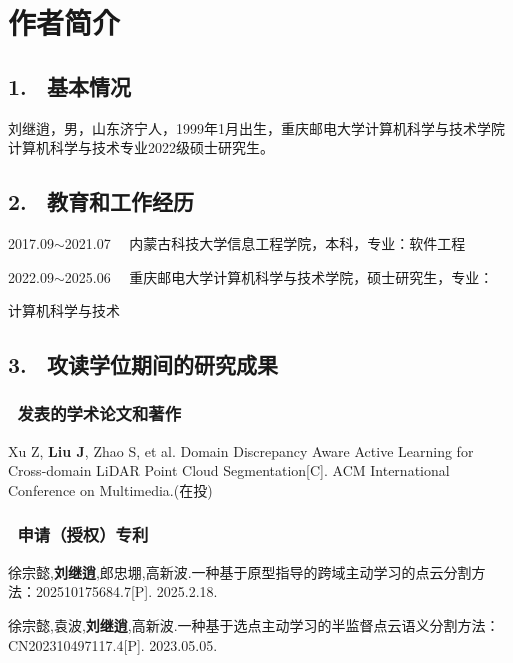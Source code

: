 \specialsectioning


\chapter{作者简介}
\thispagestyle{others}
\pagestyle{others}
\xiaosi
\section{1. \ 基本情况}
刘继逍，男，山东济宁人，1999年1月出生，重庆邮电大学计算机科学与技术学院计算机科学与技术专业2022级硕士研究生。

\section{2. \ 教育和工作经历}
2017.09$\sim$2021.07 \ \ 内蒙古科技大学信息工程学院，本科，专业：软件工程

2022.09$\sim$2025.06 \ \ 重庆邮电大学计算机科学与技术学院，硕士研究生，专业：

\qquad \qquad \qquad \qquad 计算机科学与技术


\section{3. \ 攻读学位期间的研究成果}
\subsection{ \ 发表的学术论文和著作 }
\noindent [1]
\begin{minipage}[t]{0.96\linewidth}
Xu Z, \textbf{Liu J}, Zhao S, et al. Domain Discrepancy Aware Active Learning for Cross-domain LiDAR Point Cloud Segmentation[C]. ACM International Conference on Multimedia.(在投)
\end{minipage}

\subsection{ \ 申请（授权）专利}
\noindent [1]
\begin{minipage}[t]{0.96\linewidth}
徐宗懿,\textbf{刘继逍},郎忠堋,高新波.一种基于原型指导的跨域主动学习的点云分割方法：202510175684.7[P]. 2025.2.18.
\end{minipage}
\vspace{0.20pt}

\noindent [2]
\begin{minipage}[t]{0.96\linewidth}
徐宗懿,袁波,\textbf{刘继逍},高新波.一种基于选点主动学习的半监督点云语义分割方法：CN202310497117.4[P]. 2023.05.05.
\end{minipage}
\vspace{0.20pt}

